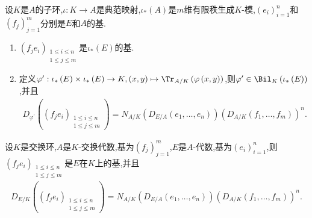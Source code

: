 \begin{proposition}{}{}
	设$K$是$A$的子环,$\iota:K\to A$是典范映射,$\iota_{\ast}\left(A\right)$是$m$维有限秩生成$K$-模,$\left(e_{i}\right)_{i=1}^{n}$和$\left(f_{j}\right)_{j=1}^{m}$分别是$E$和$A$的基.
	\begin{enumerate}
		\item $\left(f_{j}e_{i}\right)_{\substack{1\leq i\leq n\\1\leq j\leq m}}$是$\iota_{\ast}\left(E\right)$的基.
		\item 定义$\varphi^{\prime}:\iota_{\ast}\left(E\right)\times\iota_{\ast}\left(E\right)\to K,\left(x,y\right)\mapsto\Tr_{A/K}\left(\varphi\left(x,y\right)\right)$,则$\varphi^{\prime}\in\Bil_{K}\left(\iota_{\ast}\left(E\right)\right)$,并且
		\begin{align*}
			D_{\varphi^{\prime}}\left(\left(f_{j}e_{i}\right)_{\substack{1\leq i\leq n\\1\leq j\leq m}}\right)=N_{A/K}\left(D_{E/A}\left(e_{1},\ldots,e_{n}\right)\right)\left(D_{A/K}\left(f_{1},\ldots,f_{m}\right)\right)^{n}.
		\end{align*}
	\end{enumerate}
\end{proposition}

\begin{corollary}{}{}
	设$K$是交换环,$A$是$K$-交换代数,基为$\left(f_{j}\right)_{j=1}^{m}$,$E$是$A$-代数,基为$\left(e_{i}\right)_{i=1}^{n}$,则$\left(f_{j}e_{i}\right)_{\substack{1\leq i\leq n\\1\leq j\leq m}}$是$E$在$K$上的基,并且
	\begin{align*}
		D_{E/K}\left(\left(f_{j}e_{i}\right)_{\substack{1\leq i\leq n\\1\leq j\leq m}}\right)=N_{A/K}\left(D_{E/A}\left(e_{1},\ldots,e_{n}\right)\right)\left(D_{A/K}\left(f_{1},\ldots,f_{m}\right)\right)^{n}.
	\end{align*}
\end{corollary}

